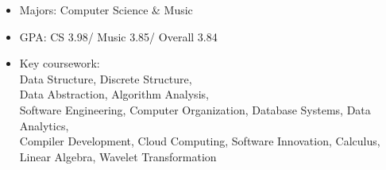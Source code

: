 \documentclass[10pt,a4paper,ragged2e]{altacv}
\begin{document}

\begin{fullwidth}
\makecvheader
\end{fullwidth}




\begin{itemize}
\item Majors: Computer Science \& Music
\item GPA: CS 3.98/ Music 3.85/ Overall 3.84
\item Key coursework:\\ Data Structure, Discrete Structure, \\ Data Abstraction, Algorithm Analysis, \\ Software Engineering, Computer Organization, Database Systems, Data Analytics, \\ Compiler Development, Cloud Computing, Software Innovation, Calculus, Linear Algebra,
Wavelet Transformation
\end{itemize}
\end{document}
